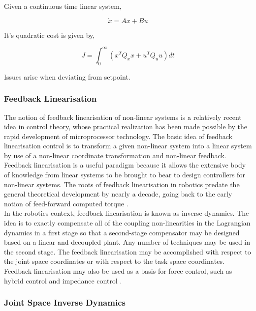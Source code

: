 \documentclass{UoNMCHA}
\numberwithin{equation}{section}
\begin{document}
	\newpage
	Given a continuous time linear system,
	
	\begin{equation}
	\dot{x} = Ax + Bu
	\end{equation}
	
	It's quadratic cost is given by,
	
	\begin{equation}
	J=\int_{0}^{\infty}(x^T Q_x x+u^T Q_u u)d t
	\end{equation}
	
	Issues arise when deviating from setpoint.
	
	\subsubsection{Feedback Linearisation}
	
	The notion of feedback linearisation of non-linear systems is a relatively recent idea in control theory, whose practical realization has been made possible by the rapid development of microprocessor technology. The basic idea of feedback linearisation control is to transform a given non-linear system into a linear system by use of a non-linear coordinate transformation and non-linear   feedback. Feedback linearisation is a useful paradigm because it allows the extensive body of knowledge from linear systems to be brought to bear to design controllers for non-linear systems. The roots of feedback linearisation in robotics predate the general theoretical development by nearly a decade, going back to the early notion of feed-forward computed torque \cite{levine_1996_the}. \\
	
	In the robotics context, feedback linearisation is known as inverse dynamics. The idea is to exactly compensate all of the coupling non-linearities in the Lagrangian dynamics in a first stage so that a second-stage compensator may be designed based on a linear and decoupled plant. Any number of techniques may be used in the second stage. The feedback linearisation may be   accomplished with respect to the joint space coordinates or with respect to the task space coordinates. Feedback linearisation may also be used as a basis for force control, such as hybrid control and impedance control \cite{levine_1996_the}. 
	
	\subsubsection*{Joint Space Inverse Dynamics}
	
\end{document}
